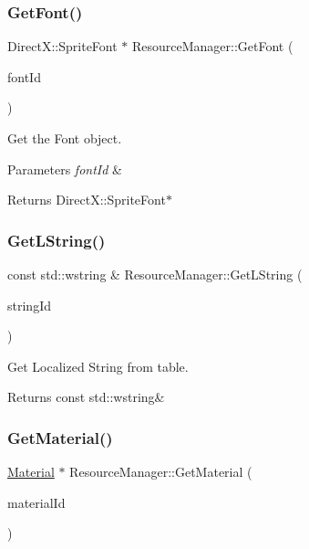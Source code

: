 \subsubsection{\texorpdfstring{Get\+Font()}{GetFont()}}
{\footnotesize\ttfamily Direct\+X\+::\+Sprite\+Font $\ast$ Resource\+Manager\+::\+Get\+Font (\begin{DoxyParamCaption}\item[{\hyperlink{classStringId}{String\+Id}}]{font\+Id }\end{DoxyParamCaption})}



Get the Font object. 


\begin{DoxyParams}{Parameters}
{\em font\+Id} & \\
\hline
\end{DoxyParams}
\begin{DoxyReturn}{Returns}
Direct\+X\+::\+Sprite\+Font$\ast$ 
\end{DoxyReturn}
\mbox{\label{classResourceManager_a168973482436d284632a2bfe1a57e692}} 
\subsubsection{\texorpdfstring{Get\+L\+String()}{GetLString()}}
{\footnotesize\ttfamily const std\+::wstring \& Resource\+Manager\+::\+Get\+L\+String (\begin{DoxyParamCaption}\item[{const std\+::string \&}]{string\+Id }\end{DoxyParamCaption})}



Get Localized String from table. 

\begin{DoxyReturn}{Returns}
const std\+::wstring\& 
\end{DoxyReturn}
\mbox{\label{classResourceManager_a73212ea2111770644e50b5531da15292}} 
\subsubsection{\texorpdfstring{Get\+Material()}{GetMaterial()}}
{\footnotesize\ttfamily \hyperlink{classMaterial}{Material} $\ast$ Resource\+Manager\+::\+Get\+Material (\begin{DoxyParamCaption}\item[{\hyperlink{classStringId}{String\+Id}}]{material\+Id }\end{DoxyParamCaption})}



